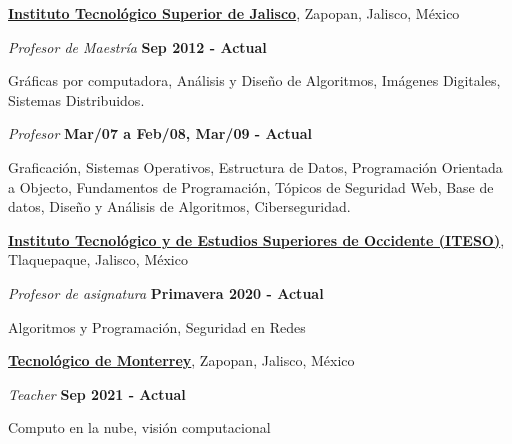 
\href{https://www.tecmm.edu.mx/}
{\textbf{Instituto Tecnológico Superior de Jalisco}},
Zapopan, Jalisco, México
\begin{outerlist}
\item[] \textit{Profesor de Maestría}%
    \hfill \textbf{Sep 2012 - Actual }
    \begin{innerlist}
        \item Gráficas por computadora, Análisis y Diseño de Algoritmos,
	      Imágenes Digitales, Sistemas Distribuidos.
    \end{innerlist}
\item[] \textit{Profesor}%
    \hfill \textbf{Mar/07 a Feb/08, Mar/09 - Actual}
    \begin{innerlist}
        \item Graficación, Sistemas Operativos, Estructura de Datos,
		Programación Orientada a Objecto, Fundamentos de Programación,
		Tópicos de Seguridad Web, Base de datos, Diseño y Análisis
		de Algoritmos, Ciberseguridad.
    \end{innerlist}
\end{outerlist}

\blankline

\href{https://iteso.mx/}
{\textbf{Instituto Tecnológico y de Estudios Superiores de Occidente (ITESO)}},
Tlaquepaque, Jalisco, México
\begin{outerlist}
\item[] \textit{Profesor de asignatura}%
    \hfill \textbf{Primavera 2020 - Actual}
    \begin{innerlist}
        \item Algoritmos y Programación, Seguridad en Redes
    \end{innerlist}
\end{outerlist}

\blankline

\href{https://tec.mx/}
{\textbf{Tecnológico de Monterrey}},
Zapopan, Jalisco, México
\begin{outerlist}
\item[] \textit{Teacher}%
    \hfill \textbf{Sep 2021 - Actual}
    \begin{innerlist}
        \item Computo en la nube, visión computacional
    \end{innerlist}
\end{outerlist}

